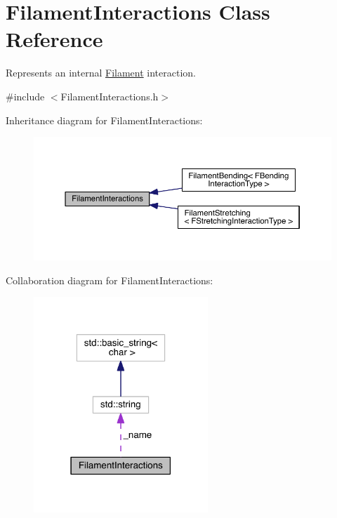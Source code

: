 \hypertarget{classFilamentInteractions}{\section{Filament\+Interactions Class Reference}
\label{classFilamentInteractions}
}


Represents an internal \hyperlink{classFilament}{Filament} interaction.  




{\ttfamily \#include $<$Filament\+Interactions.\+h$>$}



Inheritance diagram for Filament\+Interactions\+:\nopagebreak
\begin{figure}[H]
\begin{center}
\leavevmode
\includegraphics[width=350pt]{classFilamentInteractions__inherit__graph}
\end{center}
\end{figure}


Collaboration diagram for Filament\+Interactions\+:\nopagebreak
\begin{figure}[H]
\begin{center}
\leavevmode
\includegraphics[width=186pt]{classFilamentInteractions__coll__graph}
\end{center}
\end{figure}
